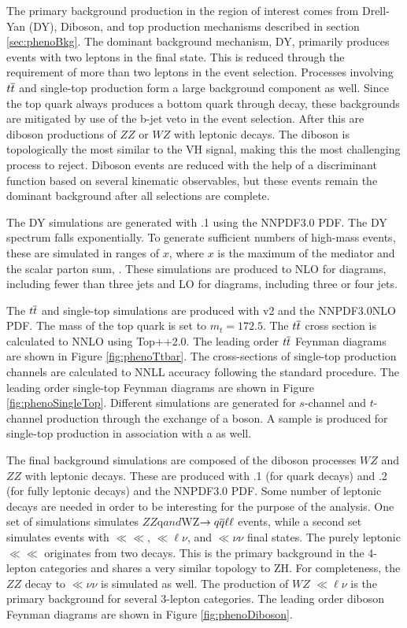 The primary background production in the region of interest comes from Drell-Yan (DY), Diboson, and top production mechanisms described in section \ref{sec:phenoBkg}.
The dominant background mechanism, DY, primarily produces events with two leptons in the final state.
This is reduced through the requirement of more than two leptons in the event selection.
Processes involving $t\overline{t}$ and single-top production form a large background component as well.
Since the top quark always produces a bottom quark through decay, these backgrounds are mitigated by use of the b-jet veto in the event selection.
After this are diboson productions of $ZZ$ or $WZ$ with leptonic decays.
The diboson is topologically the most similar to the VH signal, making this the most challenging process to reject.
Diboson events are reduced with the help of a discriminant function based on several kinematic observables, but these events remain the dominant background after all selections are complete.

The DY simulations are generated with .1 using the NNPDF3.0 PDF.
The DY \muu spectrum falls exponentially.
To generate sufficient numbers of high-mass events, these are simulated in ranges of $x$, where $x$ is the maximum of the mediator \pt and the scalar parton \pt sum, \httt.
These simulations are produced to NLO for diagrams, including fewer than three jets and LO for diagrams, including three or four jets.

The $t\overline{t}$ and single-top simulations are produced with \powheg v2 and the NNPDF3.0NLO PDF.
The mass of the top quark is set to $m_t=172.5$.
The $t\overline{t}$ cross section is calculated to NNLO using Top++2.0. \cite{Czakon:2011xx}
The leading order $t\overline{t}$ Feynman diagrams are shown in Figure \ref{fig:phenoTtbar}.
The cross-sections of single-top production channels are calculated to NNLL accuracy following the standard procedure. \cite{Kidonakis:2011wy, Kidonakis:2010ux}
The leading order single-top Feynman diagrams are shown in Figure \ref{fig:phenoSingleTop}.
Different simulations are generated for $s$-channel and $t$-channel production through the exchange of a \W boson. A sample is produced for single-top production in association with a \W as well.

The final background simulations are composed of the diboson processes $WZ$ and $ZZ$ with leptonic decays.
These are produced with .1 (for quark decays) and .2 (for fully leptonic decays) and the NNPDF3.0 PDF.
Some number of leptonic decays are needed in order to be interesting for the purpose of the analysis.
One set of simulations simulates $ZZ$\to q\qbar\ll$ and $WZ$\to q\overline{q}\ell\ell$ events, while a second set simulates events with $\ll\ll$, $\ll\ell\nu$, and $\ll\nu\nu$ final states. \cite{ATL-PHYS-PUB-2017-005}
The purely leptonic $\ll\ll$ originates from two \Z decays.
This is the primary background in the 4-lepton categories and shares a very similar topology to ZH.
For completeness, the $ZZ$ decay to $\ll\nu\nu$ is simulated as well.
The production of $WZ$ $\ll\ell\nu$ is the primary background for several 3-lepton categories.
The leading order diboson Feynman diagrams are shown in Figure \ref{fig:phenoDiboson}.

